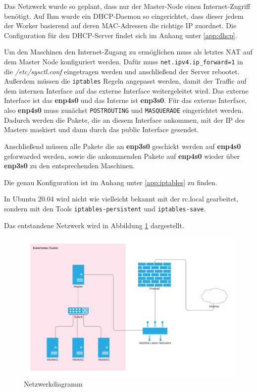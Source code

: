 Das Netzwerk wurde so geplant, dass nur der Master-Node einen Internet-Zugriff benötigt.
Auf Ihm wurde ein \ac{DHCP}-Daemon so eingerichtet, dass dieser jedem der Worker basierend auf deren \ac{MAC}-Adressen die richtige IP zuordnet. 
Die Configuration für den \ac{DHCP}-Server findet sich im Anhang unter \ref{app:dhcp}. 

Um den Maschinen den Internet-Zugang zu ermöglichen muss als letztes \ac{NAT} auf dem Master Node konfiguriert werden.
Dafür muss \texttt{net.ipv4.ip\_forward=1} in die \textit{/etc/sysctl.conf} eingetragen werden und anschließend der Server rebootet.
Außerdem müssen die \texttt{iptables} Regeln angepasst werden, damit der Traffic auf dem internen Interface auf das externe Interface weitergeleitet wird. 
Das externe Interface ist das \textbf{enp4s0} und das Interne ist \textbf{enp3s0}.
Für das externe Interface, also \textbf{enp4s0} muss zunächst \texttt{POSTROUTING} und \texttt{MASQUERADE} eingerichtet werden. 
Dadurch werden die Pakete, die an diesem Interface ankommen, mit der IP des Masters maskiert und dann durch das public Interface gesendet. 

Anschließend müssen alle Pakete die an \textbf{enp3s0} geschickt werden auf \textbf{enp4s0} geforwarded werden, sowie die ankommenden Pakete auf \textbf{enp4s0} wieder über \textbf{enp3s0} zu den entsprechenden Maschinen.

Die genau Konfiguration ist im Anhang unter \ref{app:iptables} zu finden. 

In Ubuntu 20.04 wird nicht wie vielleicht bekannt mit der rc.local gearbeitet, sondern mit den Tools \texttt{iptables-persistent} und \texttt{iptables-save}.

Das entstandene Netzwerk wird in Abbildung \ref{fig:network_diagramm} dargestellt.

\begin{figure}[h]
    \centering
    \includegraphics[width=\textwidth]{bilder/Katanetes Network.png}
    \caption{Netzwerkdiagramm}
    \label{fig:network_diagramm}
\end{figure}

